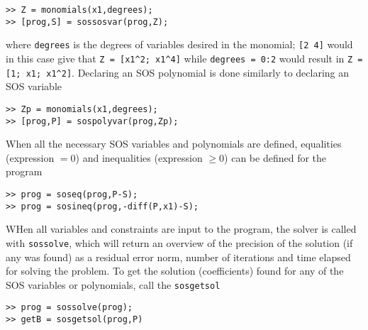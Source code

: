 \hspace*{1cm} \texttt{>> Z = monomials(x1,degrees);}\\
\hspace*{1cm} \texttt{>> [prog,S] = sossosvar(prog,Z);}

where \texttt{degrees} is the degrees of variables desired in the monomial; \texttt{[2 4]} would in this case give that \verb|Z = [x1^2; x1^4]| while \texttt{degrees = 0:2} would result in \verb|Z = [1; x1; x1^2]|. Declaring an SOS polynomial is done similarly to declaring an SOS variable

\hspace*{1cm} \texttt{>> Zp = monomials(x1,degrees);}\\
\hspace*{1cm} \texttt{>> [prog,P] = sospolyvar(prog,Zp);}

When all the necessary SOS variables and polynomials are defined, equalities (expression $=0$) and inequalities (expression $\geq 0$) can be defined for the program

\hspace*{1cm} \texttt{>> prog = soseq(prog,P-S);}\\
\hspace*{1cm} \texttt{>> prog = sosineq(prog,-diff(P,x1)-S);}

WHen all variables and constraints are input to the program, the solver is called with \texttt{sossolve}, which will return an overview of the precision of the solution (if any was found) as a residual error norm, number of iterations and time elapsed for solving the problem. To get the solution (coefficients) found for any of the SOS variables or polynomials, call the \texttt{sosgetsol}

\hspace*{1cm} \texttt{>> prog = sossolve(prog);}\\
\hspace*{1cm} \texttt{>> getB = sosgetsol(prog,P)}


